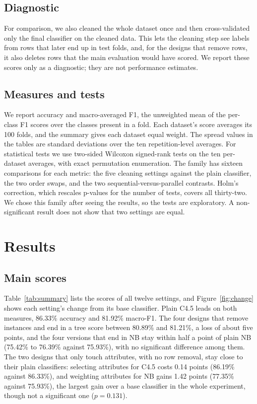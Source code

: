 \documentclass[conference]{IEEEtran}
\begin{document}
\subsection{Diagnostic}
For comparison, we also cleaned the whole dataset once and then cross-validated
only the final classifier on the cleaned data. This lets the cleaning step see
labels from rows that later end up in test folds, and, for the designs that
remove rows, it also deletes rows that the main evaluation would have scored.
We report these scores only as a diagnostic; they are not performance
estimates.

\subsection{Measures and tests}
We report accuracy and macro-averaged F1, the unweighted mean of the per-class
F1 scores over the classes present in a fold. Each dataset's score averages its
100 folds, and the summary gives each dataset equal weight. The spread values
in the tables are standard deviations over the ten repetition-level averages.
For statistical tests we use two-sided Wilcoxon signed-rank tests on the ten
per-dataset averages, with exact permutation enumeration. The family has
sixteen comparisons for each metric: the five cleaning settings against the
plain classifier, the two order swaps, and the two sequential-versus-parallel
contrasts. Holm's correction, which rescales p-values for the number of tests,
covers all thirty-two. We chose this family after seeing the results, so the
tests are exploratory. A non-significant result does not show that two settings
are equal.

\section{Results}
\label{sec:results}
\subsection{Main scores}
Table~\ref{tab:summary} lists the scores of all twelve settings, and
Figure~\ref{fig:change} shows each setting's change from its base classifier.
Plain C4.5 leads on both measures, 86.33\% accuracy and 81.92\% macro-F1. The
four designs that remove instances and end in a tree score between 80.89\% and
81.21\%, a loss of about five points, and the four versions that end in NB stay
within half a point of plain NB (75.42\% to 76.39\% against 75.93\%), with no
significant difference among them. The two designs that only touch attributes,
with no row removal, stay close to their plain classifiers: selecting
attributes for C4.5 costs 0.14 points (86.19\% against 86.33\%), and weighting
attributes for NB gains 1.42 points (77.35\% against 75.93\%), the largest gain
over a base classifier in the whole experiment, though not a significant one
($p=0.131$).
\end{document}
